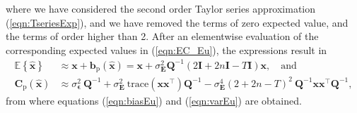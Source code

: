 where we have considered the second order Taylor series approximation (\ref{eqn:TseriesExp}), and we have removed the terms of zero expected value, and the terms of order higher than 2.
After an elementwise evaluation of the corresponding expected values in (\ref{eqn:EC_Eu}), the expressions result in 
\begin{equation} \begin{aligned} \mathbb{E} \left\{ \widehat{\mathbf{x}} \right\} & \approx \mathbf{x}  + \mathbf{b}_{\mathrm{p}} \left( \widehat{\mathbf{x}} \right) = \mathbf{x}  +  \sigma_{\mathbf{E}}^2 \mathbf{Q}^{-1} \left( 2\mathbf{I} + 2n\mathbf{I} - T \mathbf{I} \right) \mathbf{x} , \quad \text{and} \\ 
\mathbf{C}_{\mathrm{p}} \left( \widehat{\mathbf{x}} \right) & \approx \sigma_{\bm{\epsilon}}^2 \ \mathbf{Q}^{-1} + \sigma_{\mathbf{E}}^2 \ \mathrm{trace} \left( \mathbf{x} \mathbf{x}^\top \right) \mathbf{Q}^{-1} - \sigma_{\mathbf{E}}^4 \left( 2 + 2n - T \right)^2 \ \mathbf{Q}^{-1} \mathbf{x} \mathbf{x}^\top \mathbf{Q}^{-1} , \end{aligned} \end{equation}
from where equations (\ref{eqn:biasEu}) and (\ref{eqn:varEu}) are obtained.

